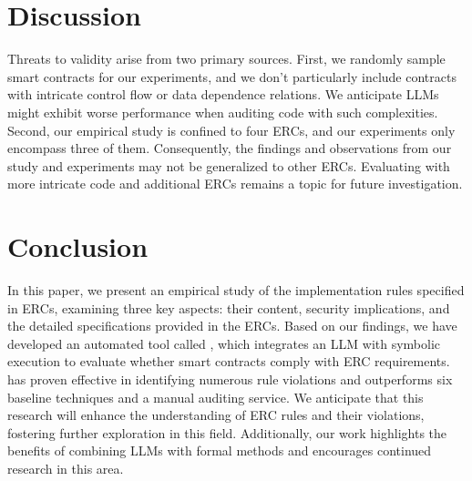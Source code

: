 
\section{Discussion} 
Threats to validity arise from two primary sources. First, we randomly sample smart contracts 
for our experiments, and we don’t particularly include contracts 
with intricate control flow or data dependence relations. We anticipate LLMs might exhibit worse performance when auditing code with such complexities. 
Second, our empirical study is confined to four ERCs, 
and our experiments only encompass three of them. 
Consequently, the findings and observations from our study and experiments 
may not be generalized to other ERCs. 
Evaluating \Tool{} with more intricate code and 
additional ERCs remains a topic for future investigation.

\fi



\section{Conclusion}

In this paper, we present an empirical study of the implementation rules specified in ERCs, 
examining three key aspects: their content, security implications, and the detailed 
specifications provided in the ERCs. Based on our findings, we have developed an automated 
tool called \Tool{}, which integrates an LLM with symbolic execution to 
evaluate whether smart contracts comply with ERC requirements. \Tool{} has proven effective 
in identifying numerous rule violations and outperforms six baseline techniques and a manual auditing service. 
We anticipate that this research will enhance the understanding of 
ERC rules and their violations, fostering further exploration in this field. Additionally, our work 
highlights the benefits of combining LLMs with formal methods and encourages continued 
research in this area.




